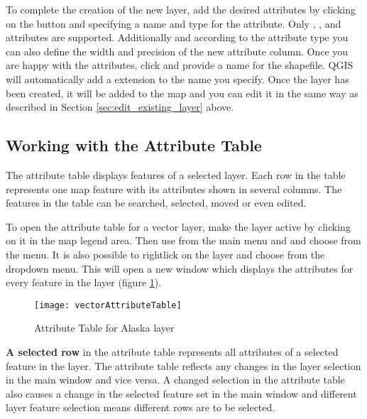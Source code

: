 To complete the creation of the new layer, add the desired attributes by
clicking on the  button and specifying a name and type for the
attribute. Only , , and
 attributes are supported. Additionally and
according to the attribute type you can also define the width and precision
of the new attribute column. Once you are happy with the attributes, click
 and provide a name for the shapefile. QGIS will automatically add
a  extension to the name you specify. Once
the layer has been created, it will be added to the map and you can edit it in
the same way as described in Section \ref{sec:edit_existing_layer} above. 

\subsection{Working with the Attribute Table}\label{sec:attribute table}

The attribute table displays features of a selected layer. Each row in the table 
represents one map feature with its attributes shown in several columns. The 
features in the table can be searched, selected, moved or even edited.

To open the attribute table for a vector layer, make the layer active by clicking 
on it in the map legend area. Then use  from the main menu 
and and choose  
from the menu. It is also possible to rightlick on the layer and 
choose  from the 
dropdown menu. This will open a new window which displays the attributes for 
every feature in the layer (figure \ref{fig:attributetable}).

\begin{figure}[ht]
   \centering
   \caption{Attribute Table for Alaska layer \nixcaption}\label{fig:attributetable}
   \texttt{[image: vectorAttributeTable]}
\end{figure}


\textbf{A selected row} in the attribute table represents all attributes of a 
selected feature in the layer. The attribute table reflects any changes 
in the layer selection in the main window and vice versa. A changed selection 
in the attribute table also causes a change in the selected feature set in the 
main window and different layer feature selection means different rows are to be 
selected.

